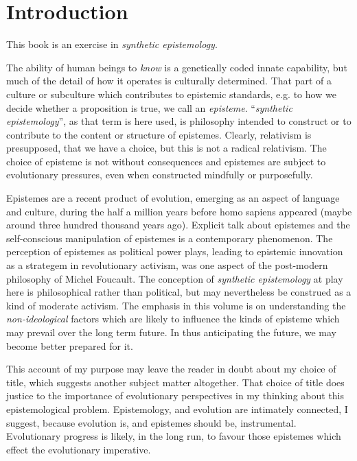 \mainmatter
\chapter{Introduction}

This book is an exercise in \emph{synthetic epistemology}.


The ability of human beings to \emph{know} is a genetically coded innate capability, but much of the detail of how it operates is culturally determined.
That part of a culture or subculture which contributes to epistemic standards, e.g. to how we decide whether a proposition is true, we call an \emph{episteme}.
``\emph{synthetic epistemology}'', as that term is here used, is philosophy intended to construct or to contribute to the content or structure of epistemes.
Clearly, relativism is presupposed, that we have a choice, but this is not a radical relativism.
The choice of episteme is not without consequences and epistemes are subject to evolutionary pressures, even when constructed mindfully or purposefully.

Epistemes are a recent product of evolution, emerging as an aspect of language and culture, during the half a million years before homo sapiens appeared (maybe around three hundred thousand years ago).
Explicit talk about epistemes and the self-conscious manipulation of epistemes is a contemporary phenomenon.
The perception of epistemes as political power plays, leading to epistemic innovation as a strategem in revolutionary activism, was one aspect of the post-modern philosophy of  Michel Foucault.
The conception of \emph{synthetic epistemology} at play here is philosophical rather than political, but may nevertheless be construed as a kind of moderate activism.
The emphasis in this volume is on understanding the \emph{non-ideological} factors which are likely to influence the kinds of episteme which may prevail over the long term future.
In thus anticipating the future, we may become better prepared for it.

This account of my purpose may leave the reader in doubt about my choice of title, which suggests another subject matter altogether.
That choice of title does justice to the importance of evolutionary perspectives in my thinking about this epistemological problem.
Epistemology, and evolution are intimately connected, I suggest, because evolution is, and epistemes should be, instrumental.
Evolutionary progress is likely, in the long run, to favour those epistemes which effect the evolutionary imperative.

